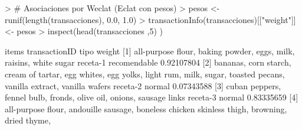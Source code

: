 \documentclass [a4paper] {article}
\begin{document}
\begin{Schunk}
\begin{Sinput}
> # Asociaciones por Weclat (Eclat con pesos)
> pesos <- runif(length(transacciones), 0.0, 1.0)
> transactionInfo(transacciones)[["weight"]] <- pesos
> inspect(head(transacciones ,5) )
\end{Sinput}
\begin{Soutput}
    items                             transactionID         tipo     weight
[1] {all-purpose flour,                                                    
     baking powder,                                                        
     eggs,                                                                 
     milk,                                                                 
     raisins,                                                              
     white sugar}                          receta-1 recomendable 0.92107804
[2] {bananas,                                                              
     corn starch,                                                          
     cream of tartar,                                                      
     egg whites,                                                           
     egg yolks,                                                            
     light rum,                                                            
     milk,                                                                 
     sugar,                                                                
     toasted pecans,                                                       
     vanilla extract,                                                      
     vanilla wafers}                       receta-2 normal       0.07343588
[3] {cuban peppers,                                                        
     fennel bulb,                                                          
     fronds,                                                               
     olive oil,                                                            
     onions,                                                               
     sausage links}                        receta-3 normal       0.83335659
[4] {all-purpose flour,                                                    
     andouille sausage,                                                    
     boneless chicken skinless thigh,                                      
     browning,                                                             
     dried thyme,                                                          
}
\end{Soutput}
\end{Schunk}
\end{document}
